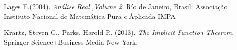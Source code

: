 \begin{thebibliography}{}
Lages E.(2004). \emph{Análise Real ,Volume 2}. Río de Janeiro, Brasil: Associação Instituto Nacional de Matemática Pura e Áplicada-IMPA

\bibitem{} Krantz, Steven G., Parks, Harold R. (2013). \emph{The Implicit Function Theorem}. Springer Science+Business Media New York.

\end{thebibliography}